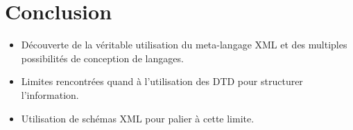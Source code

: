 \documentclass[10pt, compress]{beamer}
\begin{document}
\section{Conclusion}
\begin{frame}[fragile]
   \begin{itemize}[<+->]
  [square]
    \item Découverte de la véritable utilisation du meta-langage XML et des multiples possibilités de conception de langages.
    \item Limites rencontrées quand à l'utilisation des DTD pour structurer l'information.
    \item Utilisation de schémas XML pour palier à cette limite.
  \end{itemize}
\end{frame}
\end{document}
